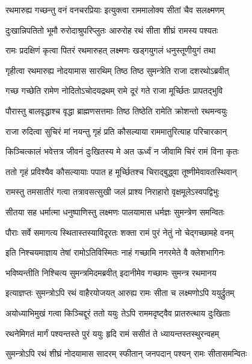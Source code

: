\twolineshloka
{रथमारुह्य गच्छन्तु वनं वनचरप्रियाः}
{इत्युक्त्वा राममालोक्य सीतां चैव सलक्ष्मणम्} %

\twolineshloka
{दुःखान्निपतितो भूमौ रुरोदाश्रुपरिप्लुतः}
{आरुरोह रथं सीता शीघ्रं रामस्य पश्यतः} %

\twolineshloka
{रामः प्रदक्षिणं कृत्वा पितरं रथमारुहत्}
{लक्ष्मणः खड्गयुगलं धनुस्तूणीयुगं तथा} %

\twolineshloka
{गृहीत्वा रथमारुह्य नोदयामास सारथिम्}
{तिष्ठ तिष्ठ सुमन्त्रेति राजा दशरथोऽब्रवीत्} %

\twolineshloka
{गच्छ गच्छेति रामेण नोदितोऽचोदयद्रथम्}
{रामे दूरं गते राजा मूर्च्छितः प्रापतद्भुवि} %

\twolineshloka
{पौरास्तु बालवृद्धाश्च वृद्धा ब्राह्मणसत्तमाः}
{तिष्ठ तिष्ठेति रामेति क्रोशन्तो रथमन्वयुः} %

\twolineshloka
{राजा रुदित्वा सुचिरं मां नयन्तु गृहं प्रति}
{कौसल्याया राममातुरित्याह परिचारकान्} %

\twolineshloka
{किञ्चित्कालं भवेत्तत्र जीवनं दुःखितस्य मे}
{अत ऊर्ध्वं न जीवामि चिरं रामं विना कृतः} %

\twolineshloka
{ततो गृहं प्रविश्यैव कौसल्यायाः पपात ह}
{मूर्च्छितश्च चिराद्बुद्ध्वा तूष्णीमेवावतस्थिवान्} %

\twolineshloka
{रामस्तु तमसातीरं गत्वा तत्रावसत्सुखी}
{जलं प्राश्य निराहारो वृक्षमूलेऽस्वपद्विभुः} %

\twolineshloka
{सीतया सह धर्मात्मा धनुष्पाणिस्तु लक्ष्मणः}
{पालयामास धर्मज्ञः सुमन्त्रेण समन्वितः} %

\twolineshloka
{पौराः सर्वे समागत्य स्थितास्तस्याविदूरतः}
{शक्ता रामं पुरं नेतुं नो चेद्गच्छामहे वनम्} %

\twolineshloka
{इति निश्चयमाज्ञाय तेषां रामोऽतिविस्मितः}
{नाहं गच्छामि नगरमेते वै क्लेशभागिनः} %

\twolineshloka
{भविष्यन्तीति निश्चित्य सुमन्त्रमिदमब्रवीत्}
{इदानीमेव गच्छामः सुमन्त्र रथमानय} %

\twolineshloka
{इत्याज्ञप्तः सुमन्त्रोऽपि रथं वाहैरयोजयत्}
{आरुह्य रामः सीता च लक्ष्मणोऽपि ययुर्द्रुतम्} %

\twolineshloka
{अयोध्याभिमुखं गत्वा किञ्चिद्दूरं ततो ययुः}
{तेऽपि राममदृष्ट्वैव प्रातरुत्थाय दुःखिताः} %

\twolineshloka
{रथनेमिगतं मार्गं पश्यन्तस्ते पुरं ययुः}
{हृदि रामं ससीतं ते ध्यायन्तस्तस्थुरन्वहम्} %

\twolineshloka
{सुमन्त्रोऽपि रथं शीघ्रं नोदयामास सादरम्}
{स्फीतान् जनपदान् पश्यन् रामः सीतासमन्वितः} %

